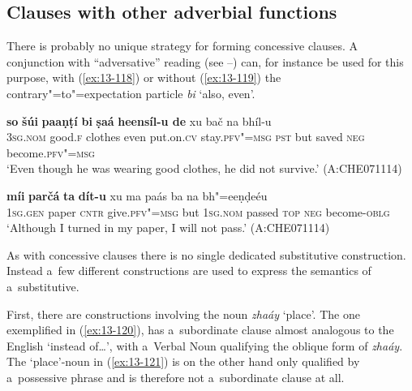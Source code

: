 \subsection{Clauses with other adverbial functions}
\label{subsec:13-4-5}

 There is probably no unique strategy for forming concessive clauses. A conjunction with ``adversative'' reading (see --) can, for instance be used for this purpose, with (\ref{ex:13-118}) or without (\ref{ex:13-119}) the contrary"=to"=expectation particle \textit{bi} `also, even'. 

\begin{exe}
\ex
\label{ex:13-118}
\gll \textbf{so} \textbf{šúi} \textbf{paaṇṭí} \textbf{bi} \textbf{ṣaá} \textbf{ heensíl-u de} xu bač na bhíl-u  \\
\textsc{3sg.nom} good.\textsc{f} clothes even put.on.\textsc{cv}  stay.\textsc{pfv"=msg } \textsc{pst} but saved \textsc{neg} become.\textsc{pfv"=msg} \\
\glt `Even though he was wearing good clothes, he did not survive.' (A:CHE071114)

\ex
\label{ex:13-119}
\gll \textbf{míi} \textbf{parčá} \textbf{ta} \textbf{dít-u} xu ma paás  ba na bh"=eeṇḍeéu \\
\textsc{1sg.gen} paper \textsc{cntr} give.\textsc{pfv"=msg} but \textsc{1sg.nom} passed \textsc{top} \textsc{neg} become-\textsc{oblg} \\
\glt `Although I turned in my paper, I will not pass.' (A:CHE071114) 
\end{exe}

 As with concessive clauses there is no single dedicated substitutive construction. Instead a~few different constructions are used to express the semantics of a~substitutive.


First, there are constructions involving the noun \textit{zhaáy} `place'. The one exemplified in (\ref{ex:13-120}), has a~subordinate clause almost analogous to the English `instead of{\ldots}', with a~Verbal Noun qualifying the oblique form of \textit{zhaáy}. The `place'-noun in (\ref{ex:13-121}) is on the other hand only qualified by a~possessive phrase and is therefore not a~subordinate clause at all. 

